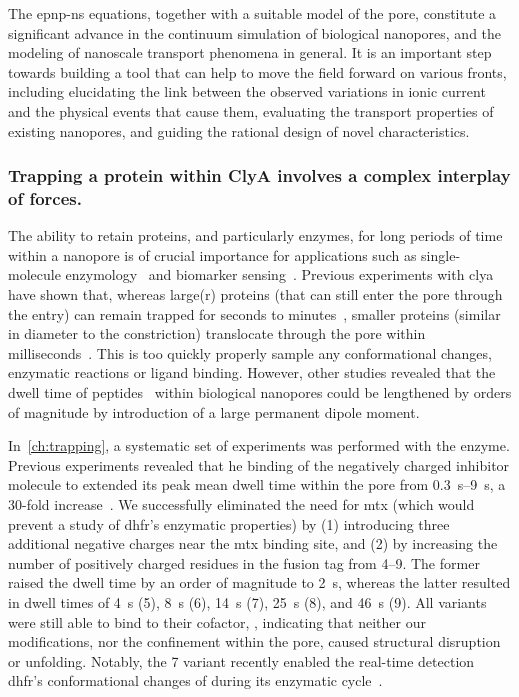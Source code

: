 The \gls{epnp-ns} equations, together with a suitable model of the pore, constitute a significant advance in
the continuum simulation of biological nanopores, and the modeling of nanoscale transport phenomena in
general. It is an important step towards building a tool that can help to move the field forward on various
fronts, including elucidating the link between the observed variations in ionic current and the physical
events that cause them, evaluating the transport properties of existing nanopores, and guiding the rational
design of novel characteristics.


\subsubsection{Trapping a protein within {ClyA} involves a complex interplay of forces.}
%

The ability to retain proteins, and particularly enzymes, for long periods of time within a nanopore is of
crucial importance for applications such as single-molecule
enzymology~\cite{Willems-VanMeervelt-2017,VanMeervelt-2014,Wloka-2017,Thakur-2019,Galenkamp-2020} and
biomarker sensing~\cite{VanMeervelt-2017,Galenkamp-2018,Zernia-2020}. Previous experiments with \gls{clya}
have shown that, whereas large(r) proteins (that can still enter the pore through the \cisi{} entry) can
remain trapped for seconds to
minutes~\cite{Soskine-2013,Soskine-2012,Soskine-Biesemans-2015,Biesemans-2015,VanMeervelt-2014,VanMeervelt-2017},
smaller proteins (similar in diameter to the \transi{} constriction) translocate through the pore within
milliseconds~\cite{Soskine-2012}. This is too quickly properly sample any conformational changes, enzymatic
reactions or ligand binding. However, other studies revealed that the dwell time of
peptides~\cite{Movileanu-2005,Asandei-2015,Asandei-2016} within biological nanopores could be lengthened by
orders of magnitude by introduction of a large permanent dipole moment.

In~\cref{ch:trapping}, a systematic set of experiments was performed with the \DHFRt{} enzyme. Previous
experiments revealed that he binding of the negatively charged inhibitor molecule  to \DHFRt{}
extended its peak mean dwell time within the pore from \SIrange{0.3}{9}{\second}, a 30-fold
increase~\cite{Soskine-Biesemans-2015}. We successfully eliminated the need for \gls{mtx} (which would prevent
a study of \gls{dhfr}'s enzymatic properties) by (1) introducing three additional negative charges near the
\gls{mtx} binding site, and (2) by increasing the number of positively charged residues in the fusion tag from
\numrange{+4}{+9}. The former raised the dwell time by an order of magnitude to \SI{2}{\second}, whereas the
latter resulted in dwell times of \SI{4}{\second} (\num{+5}), \SI{8}{\second} (\num{+6}), \SI{14}{\second}
(\num{+7}), \SI{25}{\second} (\num{+8}), and \SI{46}{\second} (\num{+9}). All variants were still able to bind
to their cofactor, , indicating that neither our modifications, nor the confinement within the pore,
caused structural disruption or unfolding. Notably, the \num{+7} \DHFRt{} variant recently enabled the
real-time detection \gls{dhfr}'s conformational changes of during its enzymatic cycle~\cite{Galenkamp-2020}.

